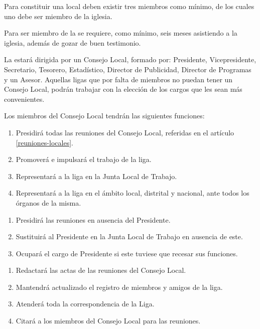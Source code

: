 

\article
Para constituir una \LMJ{} local deben existir tres miembros como mínimo, de los cuales uno debe ser miembro de la iglesia.

\article
\label{membresia-liga}
Para ser miembro de la \LMJ{} se requiere, como mínimo, seis meses asistiendo a la iglesia, además de gozar de buen testimonio.

\article
La \LMJ{} estará dirigida por un Consejo Local, formado por: Presidente, Vicepresidente, Secretario, Tesorero, Estadístico, Director de Publicidad, Director de Programas y un Asesor.
Aquellas ligas que por falta de miembros no puedan tener un Consejo Local, podrán trabajar con la elección de los cargos que les sean más convenientes.

\article
Los miembros del Consejo Local tendrán las siguientes funciones:

\begin{enumerate}
    \item Presidirá todas las reuniones del Consejo Local, referidas en el artículo \ref{reuniones-locales}.
    \item Promoverá e impulsará el trabajo de la liga.
    \item Representará a la liga en la Junta Local de Trabajo.
    \item Representará a la liga en el ámbito local, distrital y nacional, ante todos los órganos de la misma.
\end{enumerate}

\begin{enumerate}
    \item Presidirá las reuniones en ausencia del Presidente.
    \item Sustituirá al Presidente en la Junta Local de Trabajo en ausencia de este.
    \item Ocupará el cargo de Presidente si este tuviese que recesar sus funciones.
\end{enumerate}

\begin{enumerate}
    \item Redactará las actas de las reuniones del Consejo Local.
    \item Mantendrá actualizado el registro de miembros y amigos de la liga.
    \item Atenderá toda la correspondencia de la Liga.
    \item Citará a los miembros del Consejo Local para las reuniones.
\end{enumerate}

